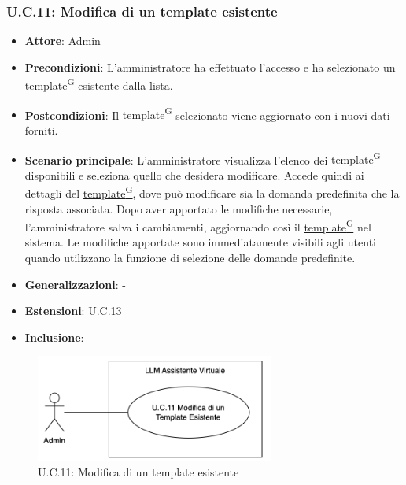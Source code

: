 \subsubsection{U.C.11: Modifica di un template esistente}
\begin{itemize}
    \item \textbf{Attore}: Admin
    \item \textbf{Precondizioni}: L'amministratore ha effettuato l'accesso e ha selezionato un \href{https://code7crusaders.github.io/docs/RTB/documentazione_interna/glossario.html#template}{template\textsuperscript{G}} esistente dalla lista.
    \item \textbf{Postcondizioni}: Il \href{https://code7crusaders.github.io/docs/RTB/documentazione_interna/glossario.html#template}{template\textsuperscript{G}} selezionato viene aggiornato con i nuovi dati forniti.
    \item \textbf{Scenario principale}: L'amministratore visualizza l'elenco dei \href{https://code7crusaders.github.io/docs/RTB/documentazione_interna/glossario.html#template}{template\textsuperscript{G}} disponibili e seleziona quello che desidera modificare. Accede quindi ai dettagli del \href{https://code7crusaders.github.io/docs/RTB/documentazione_interna/glossario.html#template}{template\textsuperscript{G}}, dove può modificare sia la domanda predefinita che la risposta associata. Dopo aver apportato le modifiche necessarie, l'amministratore salva i cambiamenti, aggiornando così il \href{https://code7crusaders.github.io/docs/RTB/documentazione_interna/glossario.html#template}{template\textsuperscript{G}} nel sistema. Le modifiche apportate sono immediatamente visibili agli utenti quando utilizzano la funzione di selezione delle domande predefinite. 
    \item \textbf{Generalizzazioni}: -
    \item \textbf{Estensioni}: U.C.13
    \item \textbf{Inclusione}: -
\end{itemize}
\begin{figure}[H]
    \centering
    \includegraphics[width=0.7\textwidth]{img/UC11.png}
    \caption{U.C.11: Modifica di un template esistente}
\end{figure}
\newpage

